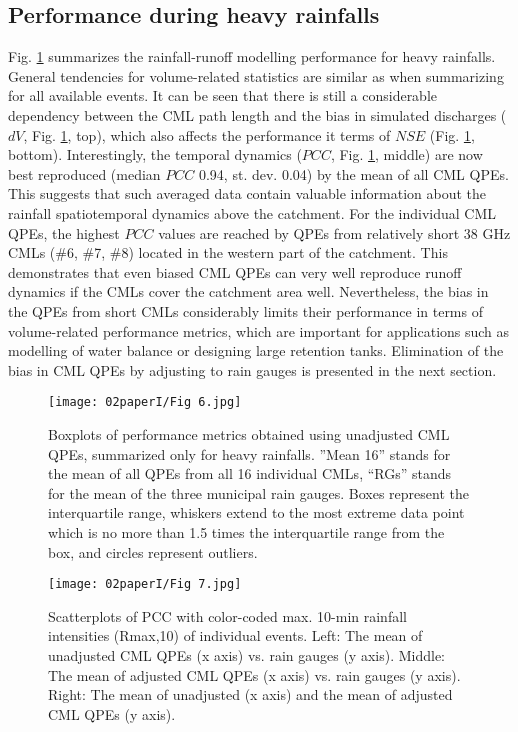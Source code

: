 \documentclass{ctuthesis}\usepackage[]{graphicx}\usepackage[]{color}
\begin{document}
\subsection{Performance during heavy rainfalls}

Fig. \ref{2fig6} summarizes the rainfall-runoff modelling performance for heavy rainfalls. General tendencies for volume-related statistics are similar as when summarizing for all available events. It can be seen that there is still a considerable dependency between the CML path length and the bias in simulated discharges ($dV$, Fig. \ref{2fig6}, top), which also affects the performance it terms of $NSE$ (Fig. \ref{2fig6}, bottom). Interestingly, the temporal dynamics ($PCC$, Fig. \ref{2fig6}, middle) are now best reproduced (median $PCC$ 0.94, st. dev. 0.04) by the mean of all CML QPEs. This suggests that such averaged data contain valuable information about the rainfall spatiotemporal dynamics above the catchment. For the individual CML QPEs, the highest $PCC$ values are reached by QPEs from relatively short 38 GHz CMLs (\#6, \#7, \#8) located in the western part of the catchment. This demonstrates that even biased CML QPEs can very well reproduce runoff dynamics if the CMLs cover the catchment area well. Nevertheless, the bias in the QPEs from short CMLs considerably limits their performance in terms of volume-related performance metrics, which are important for applications such as modelling of water balance or designing large retention tanks. Elimination of the bias in CML QPEs by adjusting to rain gauges is presented in the next section.

\begin{figure}[ph]
\begin{center}
\texttt{[image: 02paperI/Fig 6.jpg]}
\caption{Boxplots of performance metrics obtained using unadjusted CML QPEs, summarized only for heavy rainfalls. ”Mean 16” stands for the mean of all QPEs from all 16 individual CMLs, “RGs” stands for the mean of the three municipal rain gauges. Boxes represent the interquartile range, whiskers extend to the most extreme data point which is no more than 1.5 times the interquartile range from the box, and circles represent outliers.} \label{2fig6}
\end{center}
\end{figure}

\begin{figure}[ph]
\begin{center}
\texttt{[image: 02paperI/Fig 7.jpg]}
\caption{Scatterplots of PCC with color-coded max. 10-min rainfall intensities (Rmax,10) of individual events. Left: The mean of unadjusted CML QPEs (x axis) vs. rain gauges (y axis). Middle: The mean of adjusted CML QPEs (x axis) vs. rain gauges (y axis). Right: The mean of unadjusted (x axis) and the mean of adjusted CML QPEs (y axis).} \label{2fig7}
\end{center}
\end{figure}
\end{document}
